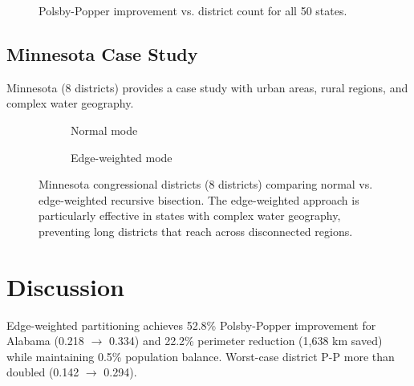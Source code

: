 \documentclass[11pt,twocolumn]{article}
\begin{document}
\begin{figure}[h]
\centering
\caption{Polsby-Popper improvement vs. district count for all 50 states.}
\label{fig:national-scatter}
\end{figure}

\subsection{Minnesota Case Study}

Minnesota (8 districts) provides a case study with urban areas, rural regions, and complex water geography.

\begin{figure}[t]
\centering
\begin{subfigure}[b]{0.48\textwidth}
    \centering
    \caption{Normal mode}
\end{subfigure}
\hfill
\begin{subfigure}[b]{0.48\textwidth}
    \centering
    \caption{Edge-weighted mode}
\end{subfigure}
\caption{Minnesota congressional districts (8 districts) comparing normal vs. edge-weighted recursive bisection. The edge-weighted approach is particularly effective in states with complex water geography, preventing long districts that reach across disconnected regions.}
\label{fig:minnesota-comparison}
\end{figure}

\section{Discussion}

Edge-weighted partitioning achieves 52.8\% Polsby-Popper improvement for Alabama (0.218 $\to$ 0.334) and 22.2\% perimeter reduction (1,638 km saved) while maintaining 0.5\% population balance. Worst-case district P-P more than doubled (0.142 $\to$ 0.294).
\end{document}
